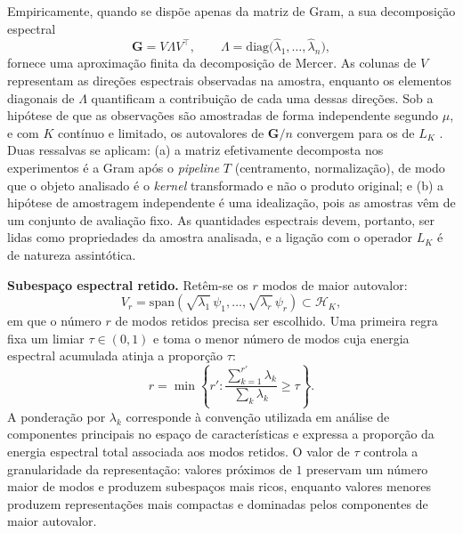 Empiricamente, quando se dispõe apenas da matriz de Gram, a sua decomposição espectral
\begin{equation}\label{eq:empirical_eigendecomposition}
    \mathbf{G} = V\Lambda V^\top, \qquad \Lambda = \mathrm{diag}\bigl(\widehat{\lambda}_1, \dots, \widehat{\lambda}_n\bigr),
\end{equation}
fornece uma aproximação finita da decomposição de Mercer. As colunas de $V$ representam as direções espectrais observadas na amostra, enquanto os elementos diagonais de $\Lambda$ quantificam a contribuição de cada uma dessas direções. Sob a hipótese de que as observações são amostradas de forma independente segundo $\mu$, e com $K$ contínuo e limitado, os autovalores de $\mathbf{G}/n$ convergem para os de $L_K$ \citep{KoltchinskiiGine2000, Rosasco2010}. Duas ressalvas se aplicam: (a) a matriz efetivamente decomposta nos experimentos é a Gram após o \textit{pipeline} $T$ (centramento, normalização), de modo que o objeto analisado é o \textit{kernel} transformado e não o produto original; e (b) a hipótese de amostragem independente é uma idealização, pois as amostras vêm de um conjunto de avaliação fixo. As quantidades espectrais devem, portanto, ser lidas como propriedades da amostra analisada, e a ligação com o operador $L_K$ é de natureza assintótica.
 
\textbf{Subespaço espectral retido.} Retêm-se os $r$ modos de maior autovalor:
\begin{equation}\label{eq:V_r}
    V_r
    =
    \mathrm{span}
    \left(
        \sqrt{\lambda_1}\,\psi_1,
        \dots,
        \sqrt{\lambda_r}\,\psi_r
    \right)
    \subset \mathcal{H}_K,
\end{equation}
em que o número $r$ de modos retidos precisa ser escolhido. Uma primeira regra fixa um limiar $\tau \in (0,1)$ e toma o menor número de modos cuja energia espectral acumulada atinja a proporção $\tau$:
\begin{equation}\label{eq:r_threshold}
    r
    =
    \min
    \left\{
        r' :
        \frac{
            \sum_{k=1}^{r'} \lambda_k
        }{
            \sum_k \lambda_k
        }
        \geq \tau
    \right\}.
\end{equation}
A ponderação por $\lambda_k$ corresponde à convenção utilizada em análise de componentes principais no espaço de características e expressa a proporção da energia espectral total associada aos modos retidos. O valor de $\tau$ controla a granularidade da representação: valores próximos de $1$ preservam um número maior de modos e produzem subespaços mais ricos, enquanto valores menores produzem representações mais compactas e dominadas pelos componentes de maior autovalor.

